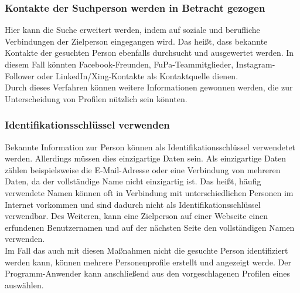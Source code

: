 		\subsubsection{Kontakte der Suchperson werden in Betracht gezogen}	
		Hier kann die Suche erweitert werden, indem auf soziale und berufliche Verbindungen der Zielperson eingegangen wird. Das heißt, dass bekannte Kontakte der gesuchten Person ebenfalls durchsucht und ausgewertet werden. In diesem Fall könnten Facebook-Freunden, FuPa-Teammitglieder, Instagram-Follower oder LinkedIn/Xing-Kontakte als Kontaktquelle dienen.\\
		Durch dieses Verfahren können weitere Informationen gewonnen werden, die zur Unterscheidung von Profilen nützlich sein könnten.
		\subsubsection{Identifikationsschlüssel verwenden}
		Bekannte Information zur Person können als Identifikationsschlüssel verwendetet werden. Allerdings müssen dies einzigartige Daten sein. Als einzigartige Daten zählen beispielsweise die E-Mail-Adresse oder eine Verbindung von mehreren Daten, da der vollständige Name nicht einzigartig ist. Das heißt, häufig verwendete Namen können oft in Verbindung mit unterschiedlichen Personen im Internet vorkommen und sind dadurch nicht als Identifikationsschlüssel verwendbar. Des Weiteren, kann eine Zielperson auf einer Webseite einen erfundenen Benutzernamen und auf der nächsten Seite den vollständigen Namen verwenden.\\
		
		Im Fall das auch mit diesen Maßnahmen nicht die gesuchte Person identifiziert werden kann, können mehrere Personenprofile erstellt und angezeigt werde. Der Programm-Anwender kann anschließend aus den vorgeschlagenen Profilen eines auswählen.  
		
